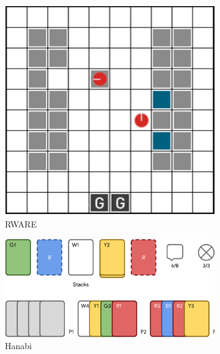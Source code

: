 \begin{figure}
    \begin{subfigure}[c]{0.225\textwidth}
        \centering
        \includegraphics[width=\textwidth]{Figures/MADRL/rware.png}
        \caption{RWARE}
        \label{fig:RWARE}
    \end{subfigure}
    \hfill
    \begin{subfigure}[c]{0.44\textwidth}
        \centering
        \includegraphics[width=\textwidth]{Figures/MADRL/hanabi.png}
        \caption{Hanabi}
        \label{fig:Hanabi}
    \end{subfigure}
    \hfill
    \begin{subfigure}[c]{0.225\textwidth}
        \centering

\end{subfigure}
\end{figure}
